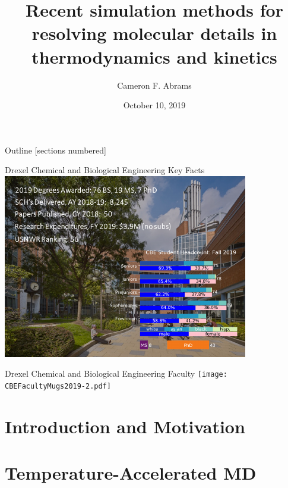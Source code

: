 \documentclass[10pt]{beamer}
\title{Recent simulation methods for resolving molecular details in thermodynamics and kinetics}
\date{October 10, 2019}
\author{Cameron F. Abrams}
\institute{Drexel University, Department of Chemical and Biological Engineering}
\begin{document}
\maketitle

\begin{frame}{Outline}
  [sections numbered]
  \tableofcontents[hideallsubsections]
\end{frame}

\begin{frame}{Drexel Chemical and Biological Engineering Key Facts}
\includegraphics[width=\textwidth]{cbefacts2.pdf}
\end{frame}

\begin{frame}{Drexel Chemical and Biological Engineering Faculty}
\texttt{[image: CBEFacultyMugs2019-2.pdf]}
\end{frame}

\section{Introduction and Motivation}







\section{Temperature-Accelerated MD}
\end{document}
